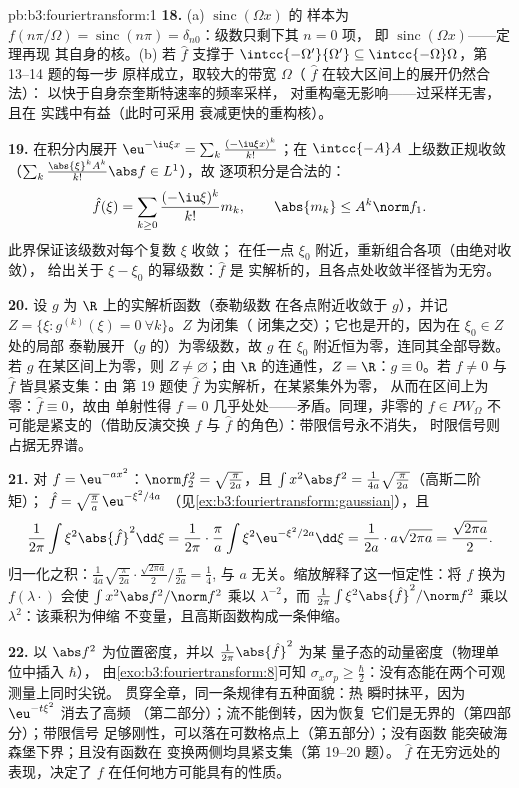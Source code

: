 \begin{solution}{pb:b3:fouriertransform:1}
\textbf{18.} (a) $\operatorname{sinc}(\Omega x)$ 的
样本为 $f(n\pi/\Omega) = \operatorname{sinc}(n\pi) =
\delta_{n0}$：级数只剩下其 $n = 0$ 项，
即 $\operatorname{sinc}(\Omega x)$——定理再现
其自身的核。(b) 若 $\hat f$ 支撑于
$\intcc{-\Omega'}{\Omega'} \subseteq
\intcc{-\Omega}\Omega$，第 13--14 题的每一步
原样成立，取较大的带宽 $\Omega$（
$\hat f$ 在较大区间上的展开仍然合法）：
以快于自身奈奎斯特速率的频率采样，
对重构毫无影响——过采样无害，且在
实践中有益（此时可采用
衰减更快的重构核）。

\textbf{19.} 在积分内展开 $\eu^{-\iu\xi x} =
\sum_k\frac{(-\iu\xi x)^k}{k!}$；在
$\intcc{-A}A$ 上级数正规收敛
（$\sum_k\frac{\abs{\xi}^kA^k}{k!}\abs f \in L^1$），故
逐项积分是合法的：
\[
\hat f(\xi) = \sum_{k\geq0}\frac{(-\iu\xi)^k}{k!}m_k,
\qquad \abs{m_k} \leq A^k\norm f_1 .
\]
此界保证该级数对每个复数 $\xi$ 收敛；
在任一点 $\xi_0$ 附近，重新组合各项（由绝对收敛），
给出关于 $\xi - \xi_0$ 的幂级数：$\hat f$ 是
实解析的，且各点处收敛半径皆为无穷。

\textbf{20.} 设 $g$ 为 $\R$ 上的实解析函数（泰勒级数
在各点附近收敛于 $g$），并记 $Z = \{\xi :
g^{(k)}(\xi) = 0\ \forall k\}$。$Z$ 为闭集（
闭集之交）；它也是开的，因为在 $\xi_0 \in Z$ 处的局部
泰勒展开（$g$ 的）为零级数，故 $g$
在 $\xi_0$ 附近恒为零，连同其全部导数。若
$g$ 在某区间上为零，则 $Z \neq \varnothing$；由
$\R$ 的连通性，$Z = \R$：$g \equiv 0$。若 $f
\neq 0$ 与 $\hat f$ 皆具紧支集：由
第 19 题使 $\hat f$ 为实解析，在某紧集外为零，
从而在区间上为零：$\hat f \equiv 0$，故由
单射性得 $f = 0$ 几乎处处——矛盾。同理，非零的 $f \in
PW_\Omega$ 不可能是紧支的（借助反演交换
$f$ 与 $\hat f$ 的角色）：带限信号永不消失，
时限信号则占据无界谱。

\textbf{21.} 对 $f = \eu^{-ax^2}$：$\norm f_2^2 =
\sqrt{\frac\pi{2a}}$，且 $\int x^2\abs f^2 =
\frac1{4a}\sqrt{\frac{\pi}{2a}}$（高斯二阶矩）；
$\hat f = \sqrt{\frac\pi a}\,\eu^{-\xi^2/4a}$
（见\cref{ex:b3:fouriertransform:gaussian}），且
\[
\frac1{2\pi}\int\xi^2\abs{\hat f}^2\dd\xi =
\frac1{2\pi}\cdot\frac\pi a\int\xi^2
\eu^{-\xi^2/2a}\dd\xi = \frac1{2a}\cdot a\sqrt{2\pi a}
= \frac{\sqrt{2\pi a}}2 .
\]
归一化之积：$\frac1{4a}\sqrt{\frac\pi{2a}}\cdot
\frac{\sqrt{2\pi a}}2\big/\frac{\pi}{2a} = \frac14$,
与 $a$ 无关。缩放解释了这一恒定性：将
$f$ 换为 $f(\lambda\cdot)$ 会使 $\int x^2\abs f^2/\norm
f^2$ 乘以 $\lambda^{-2}$，而 $\frac1{2\pi}\int\xi^2\abs{\hat
f}^2/\norm f^2$ 乘以 $\lambda^{2}$：该乘积为伸缩
不变量，且高斯函数构成一条伸缩。

\textbf{22.} 以 $\abs f^2$ 为位置密度，并以
$\frac1{2\pi}\abs{\hat f}^2$ 为某
量子态的动量密度（物理单位中插入 $\hbar$），
由\cref{exo:b3:fouriertransform:8}可知 $\sigma_x\sigma_p
\geq \frac\hbar2$：没有态能在两个可观测量上同时尖锐。
贯穿全章，同一条规律有五种面貌：热
瞬时抹平，因为 $\eu^{-t\xi^2}$ 消去了高频
（第二部分）；流不能倒转，因为恢复
它们是无界的（第四部分）；带限信号
足够刚性，可以落在可数格点上（第五部分）；没有函数
能突破海森堡下界；且没有函数在
变换两侧均具紧支集（第 19--20 题）。
$\hat f$ 在无穷远处的表现，决定了 $f$
在任何地方可能具有的性质。


\end{solution}
